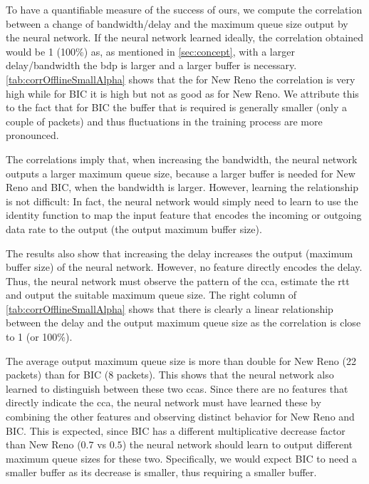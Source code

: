 \documentclass[conference]{IEEEtran}
\begin{document}
To have a quantifiable measure of the success of \gls{ours}, we compute the correlation between a change of bandwidth/delay and the maximum queue size output by the neural network. If the neural network learned ideally, the correlation obtained would be 1 (100\%) as, as mentioned in \autoref{sec:concept}, with a larger delay/bandwidth the \gls{bdp} is larger and a larger buffer is necessary. \autoref{tab:corrOfflineSmallAlpha} shows that the for New Reno the correlation is very high while for BIC it is high but not as good as for New Reno. We attribute this to the fact that for BIC the buffer that is required is generally smaller (only a couple of packets) and thus fluctuations in the training process are more pronounced. 

The correlations imply that, when increasing the bandwidth, the neural network outputs a larger maximum queue size, because a larger buffer is needed for New Reno and BIC, when the bandwidth is larger. However, learning the relationship is not difficult: In fact, the neural network would simply need to learn to use the identity function to map the input feature that encodes the incoming or outgoing data rate to the output (the output maximum buffer size). 

The results also show that increasing the delay increases the output (maximum buffer size) of the neural network. However, no feature directly encodes the delay. Thus, the neural network must observe the pattern of the \gls{cca}, estimate the \gls{rtt} and output the suitable maximum queue size. The right column of \autoref{tab:corrOfflineSmallAlpha} shows that there is clearly a linear relationship between the delay and the output maximum queue size as the correlation is close to 1 (or 100\%). 

The average output maximum queue size is more than double for New Reno (22 packets) than for BIC (8 packets). This shows that the neural network also learned to distinguish between these two \glspl{cca}. Since there are no features that directly indicate the \gls{cca}, the neural network must have learned these by combining the other features and observing distinct behavior for New Reno and BIC. This is expected, since BIC has a different multiplicative decrease factor than New Reno ($0.7$ vs $0.5$) the neural network should learn to output different maximum queue sizes for these two. Specifically, we would expect BIC to need a smaller buffer as its decrease is smaller, thus requiring a smaller buffer. 
\end{document}
